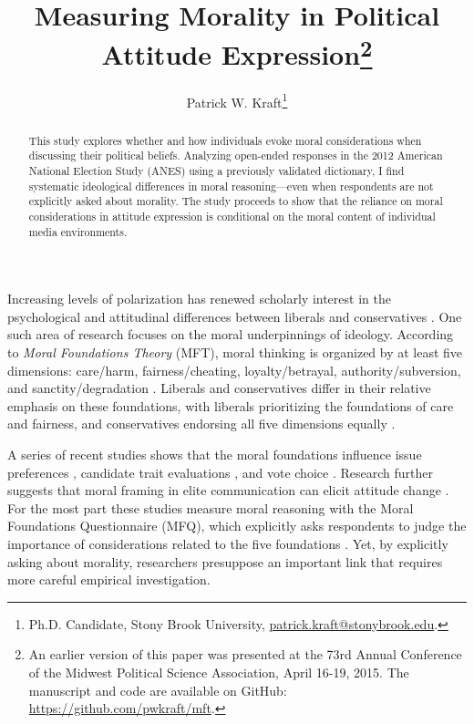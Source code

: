\documentclass[12pt]{article}
\author{Patrick W. Kraft\footnote{Ph.D. Candidate, Stony Brook University, \href{mailto:patrick.kraft@stonybrook.edu}{patrick.kraft@stonybrook.edu}.
}}
\title{Measuring Morality in Political Attitude Expression\footnote{An earlier version of this paper was presented at the 73rd Annual Conference of the Midwest Political Science Association, April 16-19, 2015. The manuscript and code are available on GitHub: \url{https://github.com/pwkraft/mft}.}}
\begin{document}
\maketitle
\doublespacing
\thispagestyle{empty}

\begin{abstract}
This study explores whether and how individuals evoke moral considerations when discussing their political beliefs. Analyzing open-ended responses in the 2012 American National Election Study (ANES) using a previously validated dictionary, I find systematic ideological differences in moral reasoning---even when respondents are not explicitly asked about morality. The study proceeds to show that the reliance on moral considerations in attitude expression is conditional on the moral content of individual media environments.

\end{abstract}
\newpage
\setcounter{page}{1}

Increasing levels of polarization has renewed scholarly interest in the psychological and attitudinal differences between liberals and conservatives \citep{jost2006end}. One such area of research focuses on the moral underpinnings of ideology. According to \textit{Moral Foundations Theory} (MFT), moral thinking is organized by at least five dimensions: care/harm, fairness/cheating, loyalty/betrayal, authority/subversion, and sanctity/degradation \citep{haidt2012righteous,graham2013moral}. Liberals and conservatives differ in their relative emphasis on these foundations, with liberals prioritizing the foundations of care and fairness, and conservatives endorsing all five dimensions equally \citep{graham2009liberals}.


A series of recent studies shows that the moral foundations influence issue preferences \citep{kertzer2014moral}, candidate trait evaluations \citep{clifford2014linking}, and vote choice \citep{iyer2010beyond}. Research further suggests that moral framing in elite communication can elicit attitude change \citep[e.g.][]{clifford2015concerns,feinberg2013moral}. For the most part these studies measure moral reasoning with the Moral Foundations Questionnaire (MFQ), which explicitly asks respondents to judge the importance of considerations related to the five foundations \citep[e.g.][]{graham2011mapping}. Yet, by explicitly asking about morality, researchers presuppose an important link that requires more careful empirical investigation.
\end{document}
